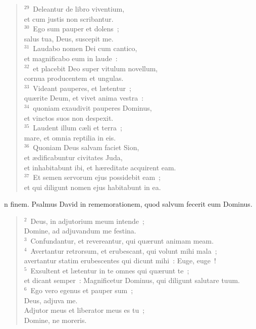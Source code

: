 \begin{flushleft}
\begin{verse}
${}^{29}$~Deleantur de libro viventium,\\ et cum justis non scribantur.\\
${}^{30}$~Ego sum pauper et dolens~;\\ salus tua, Deus, suscepit me.\\
${}^{31}$~Laudabo nomen Dei cum cantico,\\ et magnificabo eum in laude~:\\
${}^{32}$~et placebit Deo super vitulum novellum,\\ cornua producentem et ungulas.\\
${}^{33}$~Videant pauperes, et l\ae tentur~;\\ qu\ae rite Deum, et vivet anima vestra~:\\
${}^{34}$~quoniam exaudivit pauperes Dominus,\\ et vinctos suos non despexit.\\
${}^{35}$~Laudent illum c\ae li et terra~;\\ mare, et omnia reptilia in eis.\\
${}^{36}$~Quoniam Deus salvam faciet Sion,\\ et \ae dificabuntur civitates Juda,\\ et inhabitabunt ibi, et h\ae reditate acquirent eam.\\
${}^{37}$~Et semen servorum ejus possidebit eam~;\\ et qui diligunt nomen ejus habitabunt in ea.\end{verse}\end{flushleft}



\bchapter
{}n finem. Psalmus David in rememorationem, quod salvum fecerit eum Dominus.
\begin{flushleft}\begin{verse}\vspace{6pt}${}^{2}$~Deus, in adjutorium meum intende~;\\ Domine, ad adjuvandum me festina.\\
${}^{3}$~Confundantur, et revereantur, qui qu\ae runt animam meam.\\
${}^{4}$~Avertantur retrorsum, et erubescant, qui volunt mihi mala~;\\ avertantur statim erubescentes qui dicunt mihi~: Euge, euge~!\\
${}^{5}$~Exsultent et l\ae tentur in te omnes qui qu\ae runt te~;\\ et dicant semper~: Magnificetur Dominus, qui diligunt salutare tuum.\\
${}^{6}$~Ego vero egenus et pauper sum~;\\ Deus, adjuva me.\\ Adjutor meus et liberator meus es tu~;\\ Domine, ne moreris.\end{verse}\end{flushleft}



